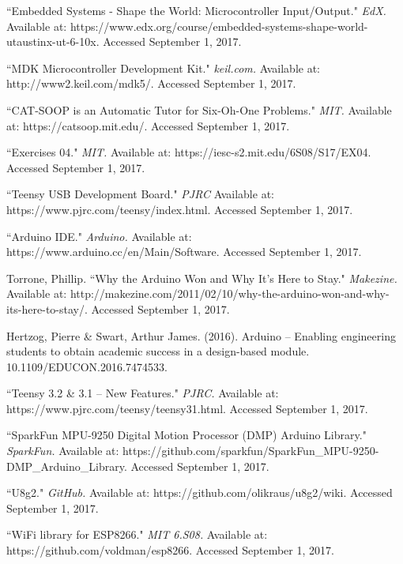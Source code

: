 \documentclass[12pt]{article}
\begin{document}
\clearpage
\raggedright
\begin{thebibliography}{}
``Embedded Systems - Shape the World: Microcontroller Input/Output." \textit{EdX.}  Available at: 
https://www.edx.org/course/embedded-systems-shape-world-utaustinx-ut-6-10x.  Accessed September 1, 2017.

``MDK Microcontroller Development Kit." \textit{keil.com.}  Available at:
http://www2.keil.com/mdk5/. Accessed September 1, 2017.

``CAT-SOOP is an Automatic Tutor for Six-Oh-One Problems."  \textit{MIT.}  Available at:
https://catsoop.mit.edu/.  Accessed September 1, 2017.

``Exercises 04."  \textit{MIT.} Available at:
https://iesc-s2.mit.edu/6S08/S17/EX04.  Accessed September 1, 2017.

``Teensy USB Development Board."  \textit{PJRC} Available at:
https://www.pjrc.com/teensy/index.html.  Accessed September 1, 2017.

``Arduino IDE." \textit{Arduino.}  Available at:
https://www.arduino.cc/en/Main/Software.  Accessed September 1, 2017.

Torrone, Phillip.  ``Why the Arduino Won and Why It's Here to Stay."  \textit{Makezine.} Available at:
http://makezine.com/2011/02/10/why-the-arduino-won-and-why-its-here-to-stay/.  Accessed September 1, 2017.

Hertzog, Pierre \& Swart, Arthur James. (2016). Arduino -- Enabling engineering students to obtain academic success in a design-based module. 10.1109/EDUCON.2016.7474533.

``Teensy 3.2 \& 3.1 -- New Features." \textit{PJRC.}  Available at:
https://www.pjrc.com/teensy/teensy31.html.  Accessed September 1, 2017.

``SparkFun MPU-9250 Digital Motion Processor (DMP) Arduino Library." \textit{SparkFun.}  Available at: 
https://github.com/sparkfun/SparkFun\_MPU-9250-DMP\_Arduino\_Library.  Accessed September 1, 2017.

``U8g2."  \textit{GitHub.}  Available at: 
https://github.com/olikraus/u8g2/wiki.  Accessed September 1, 2017.

``WiFi library for ESP8266." \textit{MIT 6.S08.}  Available at:
https://github.com/voldman/esp8266.  Accessed September 1, 2017.


\end{thebibliography}
\end{document}
